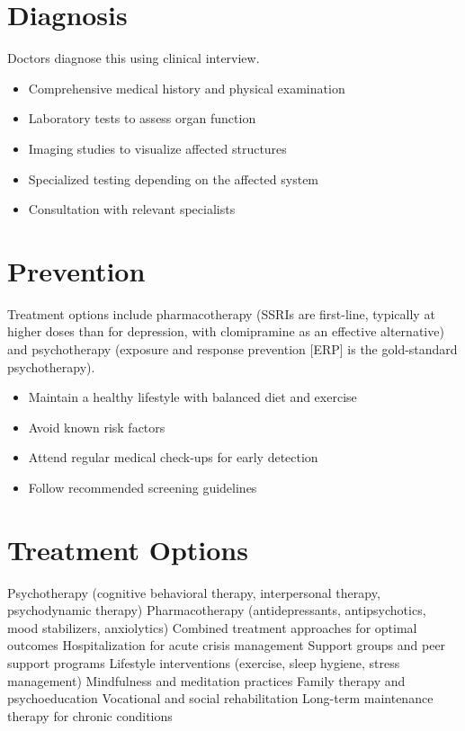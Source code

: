 \section{Diagnosis}
Doctors diagnose this using clinical interview.

\begin{itemize}[noitemsep]
  \item Comprehensive medical history and physical examination
  \item Laboratory tests to assess organ function
  \item Imaging studies to visualize affected structures
  \item Specialized testing depending on the affected system
  \item Consultation with relevant specialists
\end{itemize}
\section{Prevention}
Treatment options include pharmacotherapy (SSRIs are first-line, typically at higher doses than for depression, with clomipramine as an effective alternative) and psychotherapy (exposure and response prevention [ERP] is the gold-standard psychotherapy).

\begin{itemize}[noitemsep]
  \item Maintain a healthy lifestyle with balanced diet and exercise
  \item Avoid known risk factors
  \item Attend regular medical check-ups for early detection
  \item Follow recommended screening guidelines
\end{itemize}
\section{Treatment Options}
Psychotherapy (cognitive behavioral therapy, interpersonal therapy, psychodynamic therapy) Pharmacotherapy (antidepressants, antipsychotics, mood stabilizers, anxiolytics) Combined treatment approaches for optimal outcomes Hospitalization for acute crisis management Support groups and peer support programs Lifestyle interventions (exercise, sleep hygiene, stress management) Mindfulness and meditation practices Family therapy and psychoeducation Vocational and social rehabilitation Long-term maintenance therapy for chronic conditions

